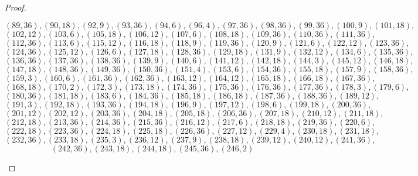 \documentclass[10pt]{article}
\theoremstyle{plain}
\theoremstyle{remark}
\begin{document}
\begin{proof}
\begin{enumerate}
    \[ \left(89, 36\right), \left(90, 18\right), \left(92, 9\right), \left(93, 36\right), \left(94, 6\right), \left(96, 4\right), \left(97, 36\right), \left(98, 36\right), \left(99, 36\right), \left(100, 9\right), \left(101, 18\right),\]
    \[ \left(102, 12\right), \left(103, 6\right), \left(105, 18\right), \left(106, 12\right), \left(107, 6\right), \left(108, 18\right), \left(109, 36\right), \left(110, 36\right), \left(111, 36\right),\]
    \[ \left(112, 36\right), \left(113, 6\right), \left(115, 12\right), \left(116, 18\right), \left(118, 9\right), \left(119, 36\right), \left(120, 9\right), \left(121, 6\right), \left(122, 12\right), \left(123, 36\right), \]
    \[\left(124, 36\right),\left(125, 12\right), \left(126, 6\right), \left(127, 18\right), \left(128, 36\right), \left(129, 18\right), \left(131, 9\right), \left(132, 12\right), \left(134, 6\right), \left(135, 36\right),\]
    \[ \left(136, 36\right), \left(137, 36\right), \left(138, 36\right), \left(139, 9\right), \left(140, 6\right), \left(141, 12\right), \left(142, 18\right), \left(144, 3\right), \left(145, 12\right), \left(146, 18\right),\]
    \[ \left(147, 18\right), \left(148, 36\right), \left(149, 36\right), \left(150, 36\right), \left(151, 4\right), \left(153, 6\right), \left(154, 36\right), \left(155, 18\right), \left(157, 9\right), \left(158, 36\right),\]
    \[ \left(159, 3\right), \left(160, 6\right), \left(161, 36\right), \left(162, 36\right), \left(163, 12\right), \left(164, 12\right), \left(165, 18\right), \left(166, 18\right), \left(167, 36\right),\]
    \[ \left(168, 18\right), \left(170, 2\right), \left(172, 3\right), \left(173, 18\right), \left(174, 36\right), \left(175, 36\right), \left(176, 36\right), \left(177, 36\right), \left(178, 3\right), \left(179, 6\right),\]
    \[ \left(180, 36\right), \left(181, 18\right), \left(183, 6\right), \left(184, 36\right), \left(185, 18\right), \left(186, 18\right), \left(187, 36\right), \left(188, 36\right), \left(189, 12\right),\]
    \[ \left(191, 3\right), \left(192, 18\right), \left(193, 36\right), \left(194, 18\right), \left(196, 9\right), \left(197, 12\right), \left(198, 6\right), \left(199, 18\right), \left(200, 36\right),\]
    \[ \left(201, 12\right), \left(202, 12\right), \left(203, 36\right), \left(204, 18\right), \left(205, 18\right), \left(206, 36\right), \left(207, 18\right), \left(210, 12\right), \left(211, 18\right),\]
    \[ \left(212, 18\right), \left(213, 36\right), \left(214, 36\right), \left(215, 36\right), \left(216, 12\right), \left(217, 6\right), \left(218, 18\right), \left(219, 36\right), \left(220, 6\right),\]
    \[ \left(222, 18\right), \left(223, 36\right), \left(224, 18\right), \left(225, 18\right), \left(226, 36\right), \left(227, 12\right), \left(229, 4\right), \left(230, 18\right), \left(231, 18\right),\]
    \[ \left(232, 36\right), \left(233, 18\right), \left(235, 3\right), \left(236, 12\right), \left(237, 9\right), \left(238, 18\right), \left(239, 12\right), \left(240, 12\right), \left(241, 36\right),\]
    \[ \left(242, 36\right), \left(243, 18\right), \left(244, 18\right), \left(245, 36\right), \left(246, 2\right)\]
  \end{enumerate}
\end{proof}
\end{document}
